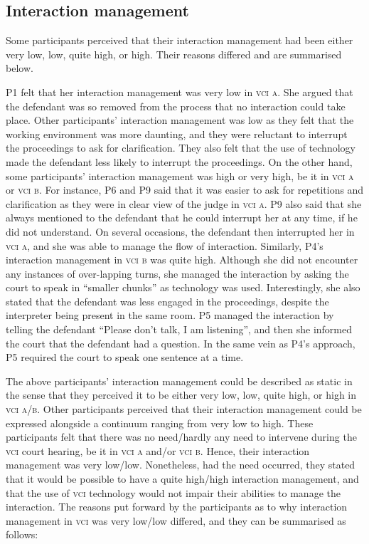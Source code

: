 \documentclass[output=paper]{langsci/langscibook}
\begin{document}
\subsection{Interaction management} 

Some participants perceived that their interaction management had been either very low, low, quite high, or high. Their reasons differed and are summarised below. 

P1 felt that her interaction management was very low in \textsc{vci a}. She argued that the defendant was so removed from the process that no interaction could take place. Other participants’ interaction management was low as they felt that the working environment was more daunting, and they were reluctant to interrupt the proceedings to ask for clarification. They also felt that the use of technology made the defendant less likely to interrupt the proceedings. On the other hand, some participants’ interaction management was high or very high, be it in \textsc{vci a} or \textsc{vci b}. For instance, P6 and P9 said that it was easier to ask for repetitions and clarification as they were in clear view of the judge in \textsc{vci a}. P9 also said that she always mentioned to the defendant that he could interrupt her at any time, if he did not understand. On several occasions, the defendant then interrupted her in \textsc{vci a}, and she was able to manage the flow of interaction. Similarly, P4’s interaction management in \textsc{vci b} was quite high. Although she did not encounter any instances of over-lapping turns, she managed the interaction by asking the court to speak in “smaller chunks” as technology was used. Interestingly, she also stated that the defendant was less engaged in the proceedings, despite the interpreter being present in the same room. P5 managed the interaction by telling the defendant “Please don’t talk, I am listening”, and then she informed the court that the defendant had a question. In the same vein as P4’s approach, P5 required the court to speak one sentence at a time. 

The above participants’ interaction management could be described as static in the sense that they perceived it to be either very low, low, quite high, or high in \textsc{vci a\slash b}. Other participants perceived that their interaction management could be expressed alongside a continuum ranging from very low to high. These participants felt that there was no need/hardly any need to intervene during the \textsc{vci} court hearing, be it in \textsc{vci a} and/or \textsc{vci b}. Hence, their interaction management was very low/low. Nonetheless, had the need occurred, they stated that it would be possible to have a quite high/high interaction management, and that the use of \textsc{vci} technology would not impair their abilities to manage the interaction. The reasons put forward by the participants as to why interaction management in \textsc{vci} was very low/low differed, and they can be summarised as follows:
\end{document}
